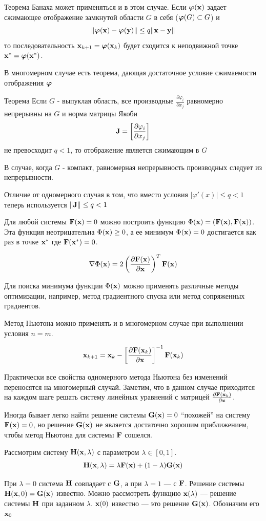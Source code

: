 \documentclass[professionalfonts,compress,unicode]{beamer}
\begin{document}
{
	Теорема Банаха может применяться и в этом случае. Если ${\boldsymbol \varphi}({\bf x})$ задает сжимающее отображение 
	замкнутой области $G$ в себя (${\boldsymbol \varphi}(G) \subset G$) и 
	$$
	\|{\boldsymbol \varphi}({\bf x}) - {\boldsymbol \varphi}({\bf y})\| \leq q \|{\bf x} - {\bf y}\|
	$$
	то последовательность ${\bf x}_{k+1} = {\boldsymbol \varphi}({\bf x}_k)$ будет сходится к неподвижной точке ${\bf x}^* = {\boldsymbol \varphi}({\bf x}^*)$.
}

{
	В многомерном случае есть теорема, дающая достаточное условие сжимаемости отображения ${\boldsymbol \varphi}$
	\begin{block}{Теорема}
		Если $G$ - выпуклая область, все производные $\frac{\partial \varphi_i}{\partial x_j}$ 
		равномерно непрерывны на $G$ и норма матрицы Якоби
		$$
		{\bf J} = \left[\frac{\partial \varphi_i}{\partial x_j} \right]
		$$
		не превосходит $q < 1$, то отображение является сжимающим в $G$
	\end{block}
	В случае, когда $G$ - компакт, равномерная непрерывность производных следует из непрерывности.
	
	Отличие от одномерного случая в том, что вместо условия $|\varphi'(x)| \leq q < 1$ теперь используется $\|{\bf J}\| \leq q < 1$
}

{
	Для любой системы ${\bf F}({\bf x}) = 0$ можно построить функцию $\Phi({\bf x}) = \left({\bf F}({\bf x}), {\bf F}({\bf x})\right)$.
	Эта функция неотрицательна $\Phi({\bf x}) \geq 0$, а ее минимум $\Phi({\bf x}) = 0$ достигается как раз в точке ${\bf x}^*$ где ${\bf F}({\bf x}^*) = 0$.
	
	$$
	\nabla \Phi({\bf x}) = 2\left(\frac{\partial {\bf F}({\bf x})}{\partial {\bf x}}\right)^T {\bf F}({\bf x})
	$$
	
	Для поиска минимума функции $\Phi({\bf x})$ можно применять различные методы оптимизации, например,
	метод градиентного спуска или метод сопряженных градиентов.
}

{
	Метод Ньютона можно применять и в многомерном случае при выполнении условия $n = m$. 
	
	$$
	{\bf x}_{k+1} = {\bf x}_k - \left[\frac{\partial {\bf F}({\bf x}_k)}{\partial {\bf x}}\right]^{-1} {\bf F}({\bf x}_k)
	$$
	
	Практически все свойства одномерного метода Ньютона без изменений переносятся на многомерный случай. Заметим, что в данном случае приходится
	на каждом шаге решать систему линейных уравнений с матрицей $\frac{\partial {\bf F}({\bf x}_k)}{\partial {\bf x}}$. 
}

{
	Иногда бывает легко найти решение системы ${\bf G}({\bf x}) = 0$ ``похожей'' на систему ${\bf F}({\bf x}) = 0$, но решение ${\bf G}({\bf x})$ не является достаточно
	хорошим приближением, чтобы метод Ньютона для системы ${\bf F}$ сошелся.
	
	Рассмотрим систему ${\bf H}({\bf x}, \lambda)$ с параметром $\lambda \in [0,1]$.
	$$
	{\bf H}({\bf x}, \lambda) = \lambda {\bf F}({\bf x}) + (1-\lambda) {\bf G}({\bf x})
	$$
	
	При $\lambda = 0$ система ${\bf H}$ совпадает с ${\bf G}$, а при $\lambda = 1$ --- с ${\bf F}$. Решение системы ${\bf H}({\bf x}, 0) = {\bf G}({\bf x})$ известно. Можно
	рассмотреть функцию ${\bf x}(\lambda)$ --- решение системы ${\bf H}$ при заданном $\lambda$. ${\bf x}(0)$ известно --- это решение ${\bf G}({\bf x})$. Обозначим его ${\bf x}_0$
}
\end{document}

